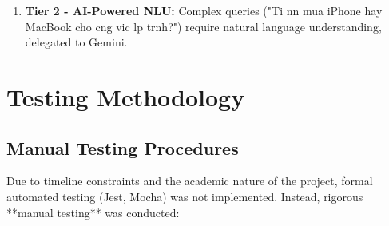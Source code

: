 \documentclass[12pt, a4paper]{report}
\begin{document}
{{\begin{enumerate}
    \item \textbf{Tier 2 - AI-Powered NLU:} Complex queries ("Ti nn mua iPhone hay MacBook cho cng vic lp trnh?") require natural language understanding, delegated to Gemini.
\end{enumerate}

\section{Testing Methodology}

\subsection{Manual Testing Procedures}

Due to timeline constraints and the academic nature of the project, formal automated testing (Jest, Mocha) was not implemented. Instead, rigorous **manual testing** was conducted:

}}
\end{document}
